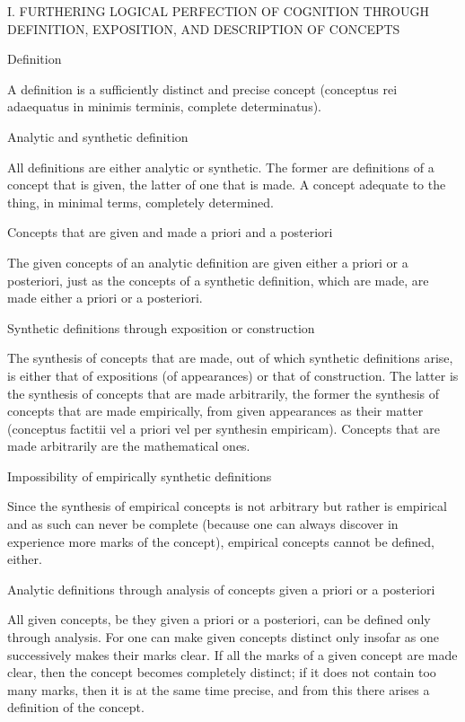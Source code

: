     I. FURTHERING LOGICAL PERFECTION OF COGNITION THROUGH
    DEFINITION, EXPOSITION, AND DESCRIPTION OF CONCEPTS

    Definition

    A definition is a sufficiently distinct and precise concept
    (conceptus rei adaequatus in minimis terminis, complete determinatus).

    Analytic and synthetic definition

    All definitions are either analytic or synthetic. The former are definitions
    of a concept that is given, the latter of one that is made.
    A concept adequate to the thing, in minimal terms, completely determined.

    Concepts that are given and made a priori and a posteriori

    The given concepts of an analytic definition are given either a priori or a
    posteriori, just as the concepts of a synthetic definition, which are made,
    are made either a priori or a posteriori.

    Synthetic definitions through exposition or construction

    The synthesis of concepts that are made,
    out of which synthetic definitions arise,
    is either that of expositions (of appearances) or that of construction.
    The latter is the synthesis of concepts that are made arbitrarily,
    the former the synthesis of concepts that are made empirically,
    from given appearances as their matter
    (conceptus factitii vel a priori vel per synthesin empiricam).
    Concepts that are made arbitrarily are the mathematical ones.

    Impossibility of empirically synthetic definitions

    Since the synthesis of empirical concepts is not arbitrary but
    rather is empirical and as such can never be complete
    (because one can always discover in experience more marks of the concept),
    empirical concepts cannot be defined, either.

    Analytic definitions through analysis of concepts given a priori or a posteriori

    All given concepts, be they given a priori or a posteriori,
    can be defined only through analysis.
    For one can make given concepts distinct only insofar as
    one successively makes their marks clear.
    If all the marks of a given
    concept are made clear, then the concept becomes completely distinct; if it
    does not contain too many marks, then it is at the same time precise, and
    from this there arises a definition of the concept.

